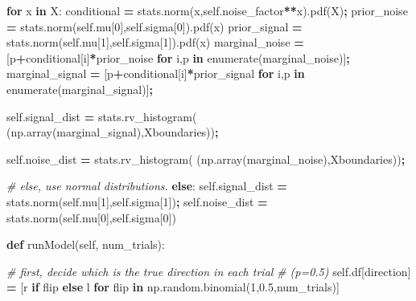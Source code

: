 \documentclass[12pt,twoside]{reedthesis}
\newenvironment{Shaded}{\begin{snugshade}}{\end{snugshade}}
\newcommand{\BuiltInTok}[1]{#1}
\newcommand{\CommentTok}[1]{\textcolor[rgb]{0.56,0.35,0.01}{\textit{#1}}}
\newcommand{\ControlFlowTok}[1]{\textcolor[rgb]{0.13,0.29,0.53}{\textbf{#1}}}
\newcommand{\DecValTok}[1]{\textcolor[rgb]{0.00,0.00,0.81}{#1}}
\newcommand{\FloatTok}[1]{\textcolor[rgb]{0.00,0.00,0.81}{#1}}
\newcommand{\KeywordTok}[1]{\textcolor[rgb]{0.13,0.29,0.53}{\textbf{#1}}}
\newcommand{\NormalTok}[1]{#1}
\newcommand{\OperatorTok}[1]{\textcolor[rgb]{0.81,0.36,0.00}{\textbf{#1}}}
\newcommand{\StringTok}[1]{\textcolor[rgb]{0.31,0.60,0.02}{#1}}
\newcommand{\VariableTok}[1]{\textcolor[rgb]{0.00,0.00,0.00}{#1}}
\begin{document}
\begin{Shaded}
\begin{Highlighting}[]
          \ControlFlowTok{for}\NormalTok{ x }\KeywordTok{in}\NormalTok{ X:}
\NormalTok{            conditional }\OperatorTok{=}\NormalTok{ stats.norm(x,}\VariableTok{self}\NormalTok{.noise\_factor}\OperatorTok{**}\NormalTok{x).pdf(X)}\OperatorTok{;}
\NormalTok{            prior\_noise }\OperatorTok{=}\NormalTok{ stats.norm(}\VariableTok{self}\NormalTok{.mu[}\DecValTok{0}\NormalTok{],}\VariableTok{self}\NormalTok{.sigma[}\DecValTok{0}\NormalTok{]).pdf(x)}
\NormalTok{            prior\_signal }\OperatorTok{=}\NormalTok{ stats.norm(}\VariableTok{self}\NormalTok{.mu[}\DecValTok{1}\NormalTok{],}\VariableTok{self}\NormalTok{.sigma[}\DecValTok{1}\NormalTok{]).pdf(x)}
\NormalTok{            marginal\_noise }\OperatorTok{=}\NormalTok{ [p}\OperatorTok{+}\NormalTok{conditional[i]}\OperatorTok{*}\NormalTok{prior\_noise }
                              \ControlFlowTok{for}\NormalTok{ i,p }\KeywordTok{in} \BuiltInTok{enumerate}\NormalTok{(marginal\_noise)]}\OperatorTok{;}
\NormalTok{            marginal\_signal }\OperatorTok{=}\NormalTok{ [p}\OperatorTok{+}\NormalTok{conditional[i]}\OperatorTok{*}\NormalTok{prior\_signal }
                               \ControlFlowTok{for}\NormalTok{ i,p }\KeywordTok{in} \BuiltInTok{enumerate}\NormalTok{(marginal\_signal)]}\OperatorTok{;}

          
          \VariableTok{self}\NormalTok{.signal\_dist }\OperatorTok{=}\NormalTok{ stats.rv\_histogram(}
\NormalTok{              (np.array(marginal\_signal),Xboundaries))}\OperatorTok{;}

          \VariableTok{self}\NormalTok{.noise\_dist }\OperatorTok{=}\NormalTok{ stats.rv\_histogram(}
\NormalTok{              (np.array(marginal\_noise),Xboundaries))}\OperatorTok{;}

        \CommentTok{\# else, use normal distributions.}
        \ControlFlowTok{else}\NormalTok{:}
          \VariableTok{self}\NormalTok{.signal\_dist }\OperatorTok{=}\NormalTok{ stats.norm(}\VariableTok{self}\NormalTok{.mu[}\DecValTok{1}\NormalTok{],}\VariableTok{self}\NormalTok{.sigma[}\DecValTok{1}\NormalTok{])}\OperatorTok{;}
          \VariableTok{self}\NormalTok{.noise\_dist }\OperatorTok{=}\NormalTok{ stats.norm(}\VariableTok{self}\NormalTok{.mu[}\DecValTok{0}\NormalTok{],}\VariableTok{self}\NormalTok{.sigma[}\DecValTok{0}\NormalTok{])}
      
    \KeywordTok{def}\NormalTok{ runModel(}\VariableTok{self}\NormalTok{, num\_trials):}

        \CommentTok{\# first, decide which is the true direction in each trial}
        \CommentTok{\# (p=0.5)}
        \VariableTok{self}\NormalTok{.df[}\StringTok{\textquotesingle{}direction\textquotesingle{}}\NormalTok{] }\OperatorTok{=}\NormalTok{ [}\StringTok{\textquotesingle{}r\textquotesingle{}} \ControlFlowTok{if}\NormalTok{ flip }\ControlFlowTok{else} \StringTok{\textquotesingle{}l\textquotesingle{}} 
               \ControlFlowTok{for}\NormalTok{ flip }\KeywordTok{in}\NormalTok{ np.random.binomial(}\DecValTok{1}\NormalTok{,}\FloatTok{0.5}\NormalTok{,num\_trials)] }


\end{Highlighting}
\end{Shaded}
\end{document}
